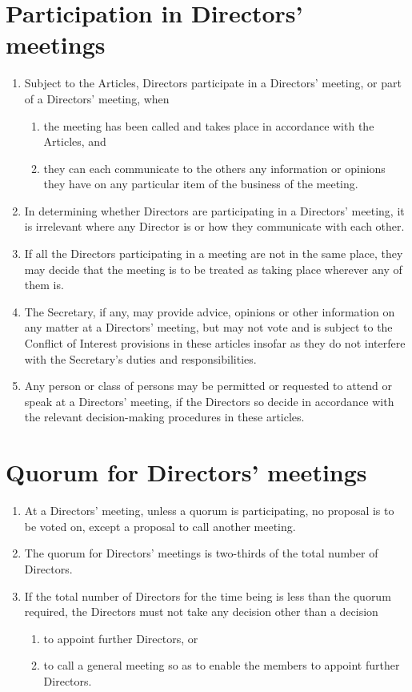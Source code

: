 \documentclass[a4paper,12pt]{article}
\begin{document}
\section{Participation in Directors' meetings}

\begin{enumerate}
  \item Subject to the Articles, Directors participate in a Directors' meeting, or part of a Directors' meeting, when
  \begin{enumerate}
    \item the meeting has been called and takes place in accordance with the Articles, and
    \item they can each communicate to the others any information or opinions they have on any particular item of the business of the meeting.
  \end{enumerate}
  \item In determining whether Directors are participating in a Directors' meeting, it is irrelevant where any Director is or how they communicate with each other.
  \item If all the Directors participating in a meeting are not in the same place, they may decide that the meeting is to be treated as taking place wherever any of them is.
  \item The Secretary, if any, may provide advice, opinions or other information on any matter at a Directors' meeting, but may not vote and is subject to the Conflict of Interest provisions in these articles insofar as they do not interfere with the Secretary's duties and responsibilities.
  \item Any person or class of persons may be permitted or requested to attend or speak at a Directors' meeting, if the Directors so decide in accordance with the relevant decision-making procedures in these articles.
\end{enumerate}

\section{Quorum for Directors' meetings}

\begin{enumerate}
  \item At a Directors' meeting, unless a quorum is participating, no proposal is to be voted on, except a proposal to call another meeting.
  \item The quorum for Directors' meetings is two-thirds of the total number of Directors.
  \item If the total number of Directors for the time being is less than the quorum required, the Directors must not take any decision other than a decision
  \begin{enumerate}
    \item to appoint further Directors, or
    \item to call a general meeting so as to enable the members to appoint further Directors.
  \end{enumerate}
\end{enumerate}
\end{document}
